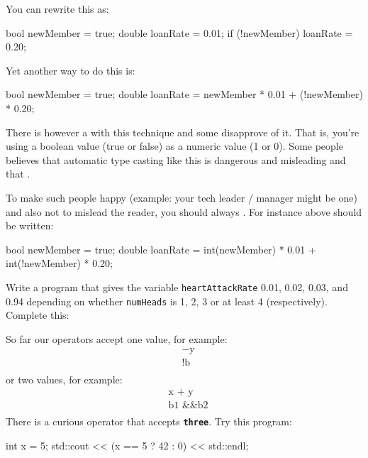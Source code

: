You can rewrite this as:
\begin{console}
bool newMember = true;
double loanRate = 0.01;
if (!newMember)
   loanRate = 0.20; 
\end{console}

Yet another way to do this is:
\begin{console}
bool newMember = true;
double loanRate = newMember * 0.01
                  + (!newMember) * 0.20; 
\end{console}

There is however a  with this technique and some disapprove of it. That is, you're using a boolean value (true or false) as a numeric value (1 or 0). Some people believes that automatic type casting like this is dangerous and misleading and that .

To make such people happy (example: your tech leader / manager might be one) and also not to mislead the reader, you should always . For instance above should be written:\\
\begin{console}
bool newMember = true;
double loanRate = int(newMember) * 0.01
                  + int(!newMember) * 0.20; 
\end{console}

\begin{ex}
Write a program that gives the variable
\texttt{heartAttackRate} 0.01, 0.02, 0.03, and 0.94 depending on whether
\texttt{numHeads} is 1, 2, 3 or at least 4 (respectively). Complete this:
\begin{console}
int numHeads = 0;
std::cin >> numHeads;
double heartAttackRate = ___________________________
std::cout << heartAttackRate << std::endl;}  
\end{console}
\end{ex}
\newpage{}

So far our operators accept one value, for example:
\begin{align*}
&\text{$-$y}\\
&\text{!b}\\
\end{align*}
or two values, for example:
\begin{align*}
& \text{x + y}\\
& \text{b1 \&\& b2}\\
\end{align*}
There is a curious operator that accepts \texttt{\textbf{three}}. Try this
program:
\begin{console}
int x = 5;
std::cout << (x == 5 ? 42 : 0) << std::endl; 
\end{console}

